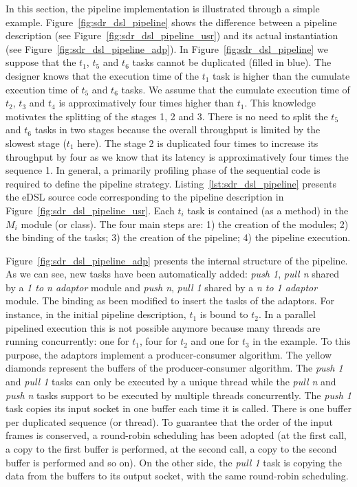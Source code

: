 In this section, the pipeline implementation is illustrated through a simple
example. Figure~\ref{fig:sdr_dsl_pipeline} shows the difference between a
pipeline description (see Figure~\ref{fig:sdr_dsl_pipeline_usr}) and its actual
instantiation (see Figure~\ref{fig:sdr_dsl_pipeline_adp}). In
Figure~\ref{fig:sdr_dsl_pipeline} we suppose that the $t_1$, $t_5$ and $t_6$
tasks cannot be duplicated (filled in blue). The designer knows that the
execution time of the $t_1$ task is higher than the cumulate execution time of
$t_5$ and $t_6$ tasks. We assume that the cumulate execution time of $t_2$,
$t_3$ and $t_4$ is approximatively four times higher than $t_1$. This knowledge
motivates the splitting of the stages 1, 2 and 3. There is no need to split the
$t_5$ and $t_6$ tasks in two stages because the overall throughput is limited by
the slowest stage ($t_1$ here). The stage 2 is duplicated four times to increase
its throughput by four as we know that its latency is approximatively four times
the sequence 1. In general, a primarily profiling phase of the sequential code
is required to define the pipeline strategy. Listing~\ref{lst:sdr_dsl_pipeline}
presents the \Cxx eDSL source code corresponding to the pipeline description in
Figure~\ref{fig:sdr_dsl_pipeline_usr}. Each $t_i$ task is contained (as a
method) in the $M_i$ module (or class). The four main steps are: 1) the creation
of the modules; 2) the binding of the tasks; 3) the creation of the pipeline; 4)
the pipeline execution.

Figure~\ref{fig:sdr_dsl_pipeline_adp} presents the internal structure of the
pipeline. As we can see, new tasks have been automatically added: \emph{push 1},
\emph{pull n} shared by a \emph{1 to n adaptor} module and \emph{push n},
\emph{pull 1} shared by a \emph{n to 1 adaptor} module. The binding as been
modified to insert the tasks of the adaptors. For instance, in the initial
pipeline description, $t_1$ is bound to $t_2$. In a parallel pipelined
execution this is not possible anymore because many threads are running
concurrently: one for $t_1$, four for $t_2$ and one for $t_3$ in the example. To
this purpose, the adaptors implement a producer-consumer algorithm. The yellow
diamonds represent the buffers of the producer-consumer algorithm. The
\emph{push 1} and \emph{pull 1} tasks can only be executed by a unique thread
while the \emph{pull n} and \emph{push n} tasks support to be executed by
multiple threads concurrently. The \emph{push 1} task copies its input socket in
one buffer each time it is called. There is one buffer per duplicated sequence
(or thread). To guarantee that the order of the input frames is conserved, a
round-robin scheduling has been adopted (at the first call, a copy to the first
buffer is performed, at the second call, a copy to the second buffer is
performed and so on). On the other side, the \emph{pull 1} task is copying the
data from the buffers to its output socket, with the same round-robin
scheduling.

